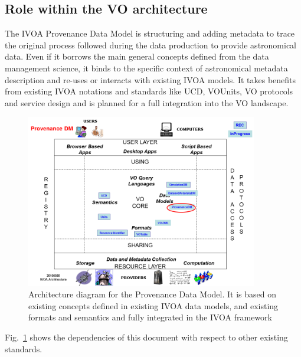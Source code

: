 \subsection{Role within the VO architecture}

The IVOA Provenance Data Model is structuring and adding metadata to trace the original process followed during the data production to provide astronomical data. Even if it borrows the main general concepts defined from the data management science, it binds to the specific context of astronomical metadata description and re-uses or interacts with existing IVOA models.
It takes benefits from existing IVOA notations and standards like UCD, VOUnits, VO protocols and service design and is planned for a full integration into the VO landscape.

\begin{figure}
\centering
\includegraphics[width=0.9\textwidth]{VOArchitecture-Prov2016.png}
\caption{Architecture diagram for the Provenance Data Model. It is based on existing concepts defined in existing IVOA data models, and existing formats and semantics and fully integrated in the IVOA framework}
\label{fig:archdiag}
\end{figure}

Fig.~\ref{fig:archdiag} shows the dependencies of this document with respect to other existing standards.
